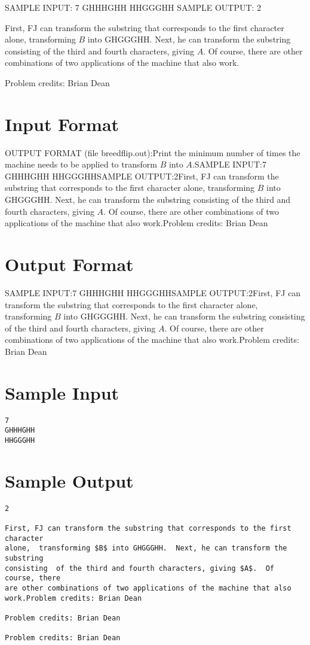 \documentclass[12pt]{article}
\begin{document}
SAMPLE INPUT:
7
GHHHGHH
HHGGGHH
SAMPLE OUTPUT: 
2

First, FJ can transform the substring that corresponds to the first character
alone,  transforming $B$ into GHGGGHH.  Next, he can transform the substring
consisting  of the third and fourth characters, giving $A$.  Of course, there
are other combinations of two applications of the machine that also work.


Problem credits: Brian Dean



\section*{Input Format}
OUTPUT FORMAT (file breedflip.out):Print the minimum number of times the machine needs to be applied to transform
$B$ into $A$.SAMPLE INPUT:7
GHHHGHH
HHGGGHHSAMPLE OUTPUT:2First, FJ can transform the substring that corresponds to the first character
alone,  transforming $B$ into GHGGGHH.  Next, he can transform the substring
consisting  of the third and fourth characters, giving $A$.  Of course, there
are other combinations of two applications of the machine that also work.Problem credits: Brian Dean

\section*{Output Format}
SAMPLE INPUT:7
GHHHGHH
HHGGGHHSAMPLE OUTPUT:2First, FJ can transform the substring that corresponds to the first character
alone,  transforming $B$ into GHGGGHH.  Next, he can transform the substring
consisting  of the third and fourth characters, giving $A$.  Of course, there
are other combinations of two applications of the machine that also work.Problem credits: Brian Dean

\section*{Sample Input}
\begin{verbatim}
7
GHHHGHH
HHGGGHH
\end{verbatim}

\section*{Sample Output}
\begin{verbatim}
2

First, FJ can transform the substring that corresponds to the first character
alone,  transforming $B$ into GHGGGHH.  Next, he can transform the substring
consisting  of the third and fourth characters, giving $A$.  Of course, there
are other combinations of two applications of the machine that also work.Problem credits: Brian Dean

Problem credits: Brian Dean

Problem credits: Brian Dean
\end{verbatim}
\end{document}
